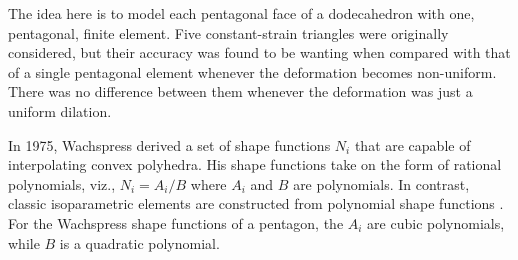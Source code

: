 The idea here is to model each pentagonal face of a dodecahedron with one, pentagonal, finite element.  Five constant-strain triangles were originally considered, but their accuracy was found to be wanting when compared with that of a single pentagonal element whenever the deformation becomes non-uniform.  There was no difference between them whenever the deformation was just a uniform dilation.

In 1975, Wachspress \cite{Wachspress75,Wachspress16} derived a set of shape functions $N_i$ that are capable of interpolating convex polyhedra.  His shape functions take on the form of rational polynomials, viz., $N_i = A_i / B$ where $A_i$ and $B$ are polynomials.  In contrast, classic isoparametric elements are constructed from polynomial shape functions \cite{Hughes87}.  For the Wachspress shape functions of a pentagon, the $A_i$ are cubic polynomials, while $B$ is a quadratic polynomial.


